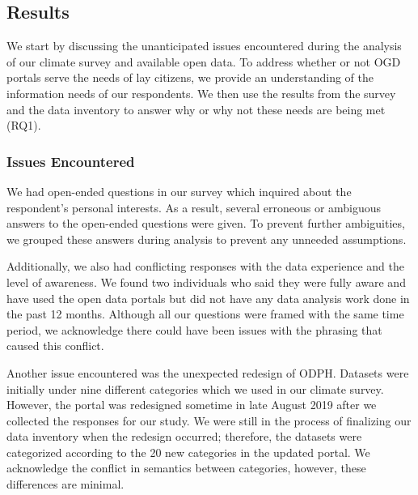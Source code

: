 \documentclass{sigchi}
\begin{document}
\subsection{Results}
We start by discussing the unanticipated issues encountered during the analysis of our climate survey and available open data. To address whether or not OGD portals serve the needs of lay citizens, we provide an understanding of the information needs of our respondents. We then use the results from the survey and the data inventory to answer why or why not these needs are being met (RQ1).

\subsubsection{Issues Encountered}

We had open-ended questions in our survey which inquired about the respondent's personal interests. As a result, several erroneous or ambiguous answers to the open-ended questions were given. To prevent further ambiguities, we grouped these answers during analysis to prevent any unneeded assumptions.

Additionally, we also had conflicting responses with the data experience and the level of awareness. We found two individuals who said they were fully aware and have used the open data portals but did not have any data analysis work done in the past 12 months. Although all our questions were framed with the same time period, we acknowledge there could have been issues with the phrasing that caused this conflict.

Another issue encountered was the unexpected redesign of ODPH. Datasets were initially under nine different categories which we used in our climate survey. However, the portal was redesigned sometime in late August 2019 after we collected the responses for our study. We were still in the process of finalizing our data inventory when the redesign occurred; therefore, the datasets were categorized according to the 20 new categories in the updated portal. We acknowledge the conflict in semantics between categories, however, these differences are minimal.
\end{document}
